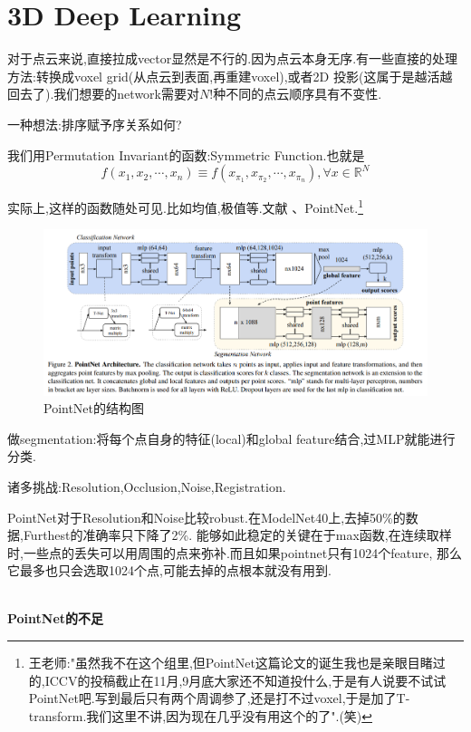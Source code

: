 \section{3D Deep Learning}

对于点云来说,直接拉成vector显然是不行的.因为点云本身无序.有一些直接的处理方法:转换成voxel grid(从点云到表面,再重建voxel),或者2D 投影(这属于是越活越回去了).我们想要的network需要对$N!$种不同的点云顺序具有不变性.

一种想法:排序赋予序关系如何?

我们用Permutation Invariant的函数:Symmetric Function.也就是
\begin{equation}
    f(x_1, x_2, \cdots, x_n) \equiv f(x_{\pi_1}, x_{\pi_2}, \cdots, x_{\pi_n}), \forall x \in \mathbb R^N
\end{equation}

实际上,这样的函数随处可见.比如均值,极值等.文献\cite{PointNet} 、PointNet.\footnote{王老师:"虽然我不在这个组里,但PointNet这篇论文的诞生我也是亲眼目睹过的,ICCV的投稿截止在11月,9月底大家还不知道投什么,于是有人说要不试试PointNet吧.写到最后只有两个周调参了,还是打不过voxel,于是加了T-transform.我们这里不讲,因为现在几乎没有用这个的了".(笑)}

\begin{figure}[htbp]
    \centering
    \includegraphics[scale=0.6]{figures/PointNet.png}
    \caption{PointNet的结构图}
\end{figure}

做segmentation:将每个点自身的特征(local)和global feature结合,过MLP就能进行分类.

诸多挑战:Resolution,Occlusion,Noise,Registration.

PointNet对于Resolution和Noise比较robust.在ModelNet40上,去掉50\%的数据,Furthest的准确率只下降了2\%.
能够如此稳定的关键在于max函数,在连续取样时,一些点的丢失可以用周围的点来弥补.而且如果pointnet只有1024个feature,
那么它最多也只会选取1024个点,可能去掉的点根本就没有用到.

\textbf{\\PointNet的不足}

